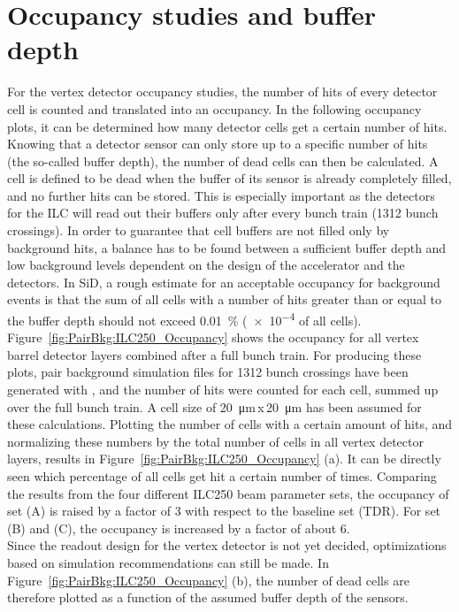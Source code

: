 \section{Occupancy studies and buffer depth}
\label{PairBkg:occupancy}
For the vertex detector occupancy studies, the number of hits of every detector cell is counted and translated into an occupancy.
In the following occupancy plots, it can be determined how many detector cells get a certain number of hits.
Knowing that a detector sensor can only store up to a specific number of hits (the so-called buffer depth), the number of dead cells can then be calculated.
A cell is defined to be dead when the buffer of its sensor is already completely filled, and no further hits can be stored.
This is especially important as the detectors for the ILC will read out their buffers only after every bunch train (1312 bunch crossings).
In order to guarantee that cell buffers are not filled only by background hits, a balance has to be found between a sufficient buffer depth and low background levels dependent on the design of the accelerator and the detectors.
In SiD, a rough estimate for an acceptable occupancy for background events is that the sum of all cells with a number of hits greater than or equal to the buffer depth should not exceed \SI{0.01}{\percent} (\num{e-4} of all cells). 
\\Figure~\ref{fig:PairBkg:ILC250_Occupancy} shows the occupancy for all vertex barrel detector layers combined after a full bunch train.
For producing these plots, pair background simulation files for 1312 bunch crossings have been generated with \guineapig, and the number of hits were counted for each cell, summed up over the full bunch train.
A cell size of \SI{20}{\micro\meter}\,x\,\SI{20}{\micro\meter} has been assumed for these calculations.
Plotting the number of cells with a certain amount of hits, and normalizing these numbers by the total number of cells in all vertex detector layers, results in Figure~\ref{fig:PairBkg:ILC250_Occupancy} (a).
It can be directly seen which percentage of all cells get hit a certain number of times.
Comparing the results from the four different ILC250 beam parameter sets, the occupancy of set (A) is raised by a factor of 3 with respect to the baseline set (TDR).
For set (B) and (C), the occupancy is increased by a factor of about 6.
\\Since the readout design for the vertex detector is not yet decided, optimizations based on simulation recommendations can still be made.
In Figure~\ref{fig:PairBkg:ILC250_Occupancy} (b), the number of dead cells are therefore plotted as a function of the assumed buffer depth of the sensors.
